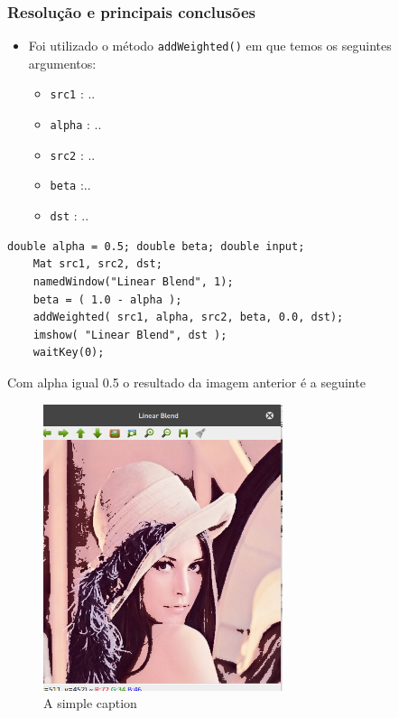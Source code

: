 \documentclass[portuguese, times, mirror]{revdetua}
\begin{document}
\subsubsection{Resolução e principais conclusões}

\begin{itemize}
    \item Foi utilizado o método \texttt{addWeighted()} em que temos os seguintes argumentos:
    \begin{itemize}
        \item \texttt{src1} : ..
        \item \texttt{alpha} : ..
        \item \texttt{src2} : ..
        \item \texttt{beta} :..
        \item \texttt{dst} : ..
    \end{itemize}
    
    
    
\end{itemize}





\begin{lstlisting}[caption=Proposta de resolução do exercício 5,label=code:C]
    double alpha = 0.5; double beta; double input;
    Mat src1, src2, dst;
    namedWindow("Linear Blend", 1);
    beta = ( 1.0 - alpha );
    addWeighted( src1, alpha, src2, beta, 0.0, dst);
    imshow( "Linear Blend", dst );
    waitKey(0);
\end{lstlisting}


Com alpha igual 0.5 o resultado da imagem anterior é a seguinte
\begin{figure}[ht!]
\centering
\includegraphics[width=70mm]{img/ex2.png}
\caption{A simple caption \label{overflow}}
\end{figure}
\end{document}
